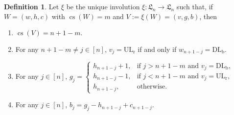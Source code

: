 \documentclass[12pt,reqno]{amsart}
\numberwithin{equation}{section}
\theoremstyle{plain}
\theoremstyle{definition}
\newtheorem{Def}[theorem]{Definition}
\def\ULr{\operatorname{UL_r}}
\def\DLb{\operatorname{DL_b}}
\def\LH{\mathfrak{L}}
\def\cs{\operatorname{cs}}
\begin{document}
\begin{Def}\label{def:xsi}
Let $\xi$ be the unique involution $\xi:\LH_n\rightarrow \LH_n$ such that, if $W=(w,h,c)$ with $\cs(W)=m$ and $V:=\xi(W)=(v,g,b)$, then
\begin{enumerate}
  \item $\cs(V)=n+1-m$.
  \item For any $n+1-m\neq j\in [n]$, $v_j=\ULr$ if and only if $w_{n+1-j}=\DLb$.
  \item For any $j\in[n]$, $g_j=
  \begin{cases}
  h_{n+1-j}+1, & \text{if $j>n+1-m$ and $v_j=\DLb$,} \\
  h_{n+1-j}-1, & \text{if $j<n+1-m$ and $v_j=\ULr$,} \\
  h_{n+1-j}, & \text{otherwise}.
  \end{cases}$
  \item For any $j\in[n]$, $b_j=g_j-h_{n+1-j}+c_{n+1-j}$.
\end{enumerate}
\end{Def}
\end{document}
